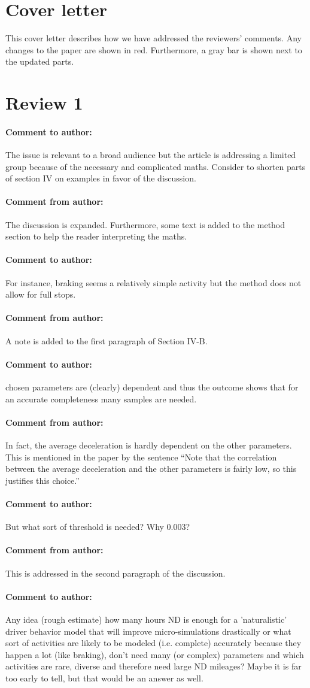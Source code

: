 \documentclass[10pt,final,a4paper,oneside,onecolumn]{article}
\newcommand{\toauthor}{\paragraph*{Comment to author:}}
\newcommand{\fromauthor}{\paragraph*{Comment from author:}}
\begin{document}
	
\section*{Cover letter}

This cover letter describes how we have addressed the reviewers' comments. Any changes to the paper are shown in \color{red}red\color{black}. Furthermore, a gray bar is shown next to the updated parts.
	
\section*{Review 1}

\toauthor The issue is relevant to a broad audience but the article is addressing a limited group because of the necessary and complicated maths. Consider to shorten parts of section IV on examples in favor of the discussion. 

\fromauthor The discussion is expanded. Furthermore, some text is added to the method section to help the reader interpreting the maths.

\toauthor For instance, braking seems a relatively simple activity but the method does not allow for full stops.

\fromauthor A note is added to the first paragraph of Section IV-B.

\toauthor chosen parameters are (clearly) dependent and thus the outcome shows that for an accurate completeness many samples are needed. 

\fromauthor In fact, the average deceleration is hardly dependent on the other parameters. This is mentioned in the paper by the sentence ``Note that the correlation between the average deceleration and the other parameters is fairly low, so this justifies this choice.''

\toauthor But what sort of threshold is needed? Why 0.003? 

\fromauthor This is addressed in the second paragraph of the discussion.

\toauthor Any idea (rough estimate) how many hours ND is enough for a 'naturalistic' driver behavior model that will improve micro-simulations drastically or what sort of activities are likely to be modeled (i.e. complete) accurately because they happen a lot (like braking), don't need many (or complex) parameters and which activities are rare, diverse and therefore need large ND mileages? Maybe it is far too early to tell, but that would be an answer as well. 
\end{document}
